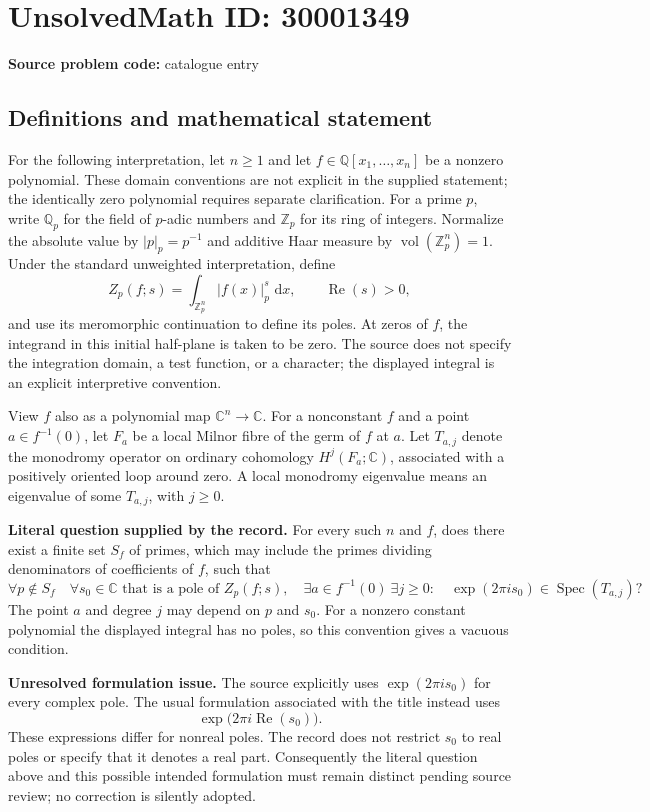 \documentclass[11pt]{article}
\newcommand{\Z}{\mathbb{Z}}
\newcommand{\Q}{\mathbb{Q}}
\newcommand{\C}{\mathbb{C}}
\newcommand{\dd}{\,\mathrm{d}}
\begin{document}
\section*{UnsolvedMath ID: 30001349}
\textbf{Source problem code:} catalogue entry
\subsection{Definitions and mathematical statement}
For the following interpretation, let \(n\geq 1\) and let \(f\in\Q[x_1,\ldots,x_n]\) be a nonzero polynomial. These domain conventions are not explicit in the supplied statement; the identically zero polynomial requires separate clarification. For a prime \(p\), write \(\Q_p\) for the field of \(p\)-adic numbers and \(\Z_p\) for its ring of integers. Normalize the absolute value by \(|p|_p=p^{-1}\) and additive Haar measure by \(\operatorname{vol}(\Z_p^n)=1\). Under the standard unweighted interpretation, define
\[
 Z_p(f;s)=\int_{\Z_p^n}|f(x)|_p^s\,\dd x,
 \qquad \operatorname{Re}(s)>0,
\]
and use its meromorphic continuation to define its poles. At zeros of \(f\), the integrand in this initial half-plane is taken to be zero. The source does not specify the integration domain, a test function, or a character; the displayed integral is an explicit interpretive convention.

View \(f\) also as a polynomial map \(\C^n\to\C\). For a nonconstant \(f\) and a point \(a\in f^{-1}(0)\), let \(F_a\) be a local Milnor fibre of the germ of \(f\) at \(a\). Let \(T_{a,j}\) denote the monodromy operator on ordinary cohomology \(H^j(F_a;\C)\), associated with a positively oriented loop around zero. A local monodromy eigenvalue means an eigenvalue of some \(T_{a,j}\), with \(j\geq 0\).

\textbf{Literal question supplied by the record.} For every such \(n\) and \(f\), does there exist a finite set \(S_f\) of primes, which may include the primes dividing denominators of coefficients of \(f\), such that
\[
 \forall p\notin S_f\quad
 \forall s_0\in\C\text{ that is a pole of }Z_p(f;s),\quad
 \exists a\in f^{-1}(0)\ \exists j\geq 0:
 \quad \exp(2\pi i s_0)\in\operatorname{Spec}(T_{a,j})?
\]
The point \(a\) and degree \(j\) may depend on \(p\) and \(s_0\). For a nonzero constant polynomial the displayed integral has no poles, so this convention gives a vacuous condition.

\textbf{Unresolved formulation issue.} The source explicitly uses \(\exp(2\pi i s_0)\) for every complex pole. The usual formulation associated with the title instead uses
\[
 \exp\bigl(2\pi i\operatorname{Re}(s_0)\bigr).
\]
These expressions differ for nonreal poles. The record does not restrict \(s_0\) to real poles or specify that it denotes a real part. Consequently the literal question above and this possible intended formulation must remain distinct pending source review; no correction is silently adopted.
\end{document}
